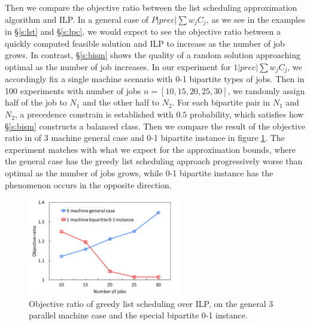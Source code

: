 Then we compare the objective ratio between the list scheduling approximation algorithm and ILP. In a general case of $P|prec|\sum w_j C_j$, as we see in the examples in \S\ref{s:lst} and \S\ref{s:lpc}, we would expect to see the objective ratio between a quickly computed feasible solution and ILP to increase as the number of job grows. In contrast, \S\ref{s:bism} shows the quality of a random solution approaching optimal as the number of job increases. In our experiment for $1|prec|\sum w_j C_j$, we accordingly fix a single machine scenario with 0-1 bipartite types of jobs. Then in 100 experiments with number of jobs $n = [10, 15, 20, 25, 30]$, we randomly assign half of the job to $N_1$ and the other half to $N_2$. For each bipartite pair in $N_1$ and $N_2$, a precedence constrain is established with $0.5$ probability, which satisfies how \S\ref{s:bism} constructs a balanced class. Then we compare the result of the objective ratio in of 3 machine general case and 0-1 bipartite instance in figure \ref{fig:obj_ratio}. The experiment matches with what we expect for the approximation bounds, where the general case has the greedy list scheduling approach progressively worse than optimal as the number of jobs grows, while 0-1 bipartite instance has the phenomenon occurs in the opposite direction. 

\begin{figure}[h]
	\centering
	\includegraphics[width=0.6\textwidth]{figs/obj_ratio.pdf}
	\caption{Objective ratio of greedy list scheduling over ILP, on the general 3 parallel machine case and the special bipartite 0-1 instance.}
	\label{fig:obj_ratio}
\end{figure}
